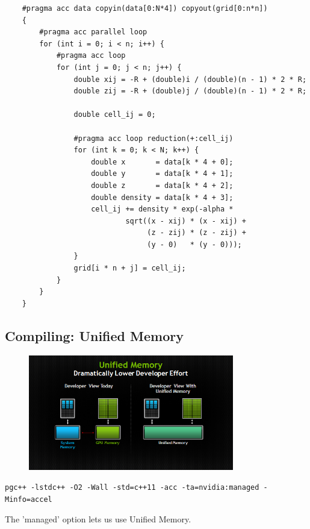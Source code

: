 \documentclass[a4paper,12pt]{article}
\begin{document}
\begin{verbatim}
    #pragma acc data copyin(data[0:N*4]) copyout(grid[0:n*n])
    {
        #pragma acc parallel loop
        for (int i = 0; i < n; i++) {
            #pragma acc loop
            for (int j = 0; j < n; j++) {
                double xij = -R + (double)i / (double)(n - 1) * 2 * R;
                double zij = -R + (double)j / (double)(n - 1) * 2 * R;

                double cell_ij = 0;

                #pragma acc loop reduction(+:cell_ij)
                for (int k = 0; k < N; k++) {
                    double x       = data[k * 4 + 0];
                    double y       = data[k * 4 + 1];
                    double z       = data[k * 4 + 2];
                    double density = data[k * 4 + 3];
                    cell_ij += density * exp(-alpha *
                            sqrt((x - xij) * (x - xij) +
                                 (z - zij) * (z - zij) +
                                 (y - 0)   * (y - 0)));
                }
                grid[i * n + j] = cell_ij;
            }
        }
    }
\end{verbatim}

\subsection{Compiling: Unified Memory}

\begin{figure}[H]
    \centering
    \includegraphics[width=0.8\textwidth]{img/unified-memory.png}
\end{figure}

\begin{verbatim}
pgc++ -lstdc++ -O2 -Wall -std=c++11 -acc -ta=nvidia:managed -Minfo=accel
\end{verbatim}

The 'managed' option lets us use Unified Memory.
\end{document}
